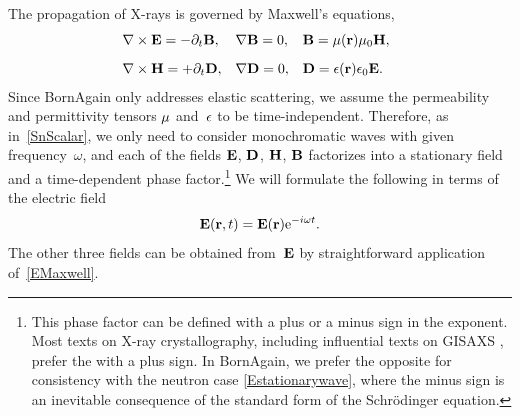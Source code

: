 The propagation of X-rays is governed by Maxwell's equations,
%
\begin{equation}\label{EMaxwell}
  \begin{array}{@{}l@{\quad}l@{\quad}l}
    \Nabla\times\v{E}=-\partial_t \v{B},
   &\Nabla\v{B}=0,
   &\v{B}=\v{\mu}(\r)\mu_0\v{H},
   \\[2ex]
    \Nabla\times\v{H}=+\partial_t \v{D},
   &\Nabla\v{D}=0,
   &\v{D}=\v{\eps}(\r)\eps_0\v{E}.
  \end{array}
\end{equation}
%
%
%
%
%
%
Since BornAgain only addresses elastic scattering,
%
%
we assume the permeability and permittivity tensors $\mathbf{\mu}$ and~$\mathbf{\epsilon}$
to be time-independent.
%
Therefore, as in~\cref{SnScalar}, we only need to consider monochromatic waves
%
%
with given frequency~$\omega$,
and each of the fields $\mathbf{E}$, $\mathbf{D}$, $\mathbf{H}$, $\mathbf{B}$
factorizes into a stationary field and a time-dependent phase factor.\footnote
{This phase factor can be defined with a plus or a minus sign in the exponent.
Most texts on X-ray crystallography,
including influential texts on GISAXS \cite{ReLL09},
prefer the  with a plus sign.
%
%
%
%
In BornAgain, we prefer the opposite 
%
for consistency with the neutron case \cref{Estationarywave},
where the minus sign is an inevitable consequence
of the standard form of the Schrödinger equation.%
%
}
%
We will formulate the following in terms of the electric field
%
\begin{equation}\label{EstationaryX}
  \mathbf{E}(\mathbf{r},t) = \mathbf{E}(\mathbf{r})\mathrm e^{-i\omega t}.
\end{equation}
The other three fields can be obtained from~$\mathbf{E}$
by straightforward application of~\cref{EMaxwell}.

